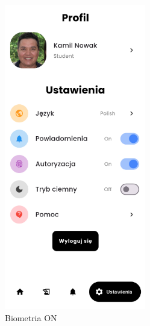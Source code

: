 \begin{figure}[h!]
	\centering
	\includegraphics[width=0.55\textwidth]{rys/biometricssONN.png}
	\caption{Biometria ON}
	\label{rys:biomteriaON}
\end{figure}


